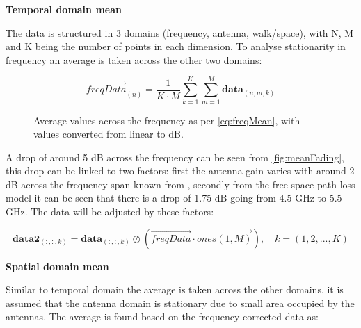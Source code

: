 \newpage
\textbf{Temporal domain mean}

The data is structured in 3 domains (frequency, antenna, walk/space), with N, M and K being the number of points in each dimension. To analyse stationarity in frequency an average is taken across the other two domains:

\begin{equation}\label{eq:freqMean}
\overrightarrow{freqData}_{(n)} = \frac{1}{K\cdot M}\sum_{k = 1}^{K}\sum_{m = 1}^{M} \textbf{data}_{(n,m,k)}
\end{equation}
\begin{where}
\end{where}


\begin{figure}[H]
\centering

\caption{Average values across the frequency as per \autoref{eq:freqMean}, with values converted from linear to dB.}
\label{fig:meanFading}
\end{figure}

A drop of around 5 dB across the frequency can be seen from \autoref{fig:meanFading}, this drop can be linked to two factors: first the antenna gain varies with around 2 dB across the frequency span known from , secondly from the free space path loss model it can be seen that there is a drop of 1.75 dB going from 4.5 GHz to 5.5 GHz. The data will be adjusted by these factors:

\begin{equation}
\textbf{data2}_{(:,:,k)} =  \textbf{data}_{(:,:,k)} \oslash \left(\overrightarrow{freqData}\cdot \overrightarrow{ones(1,M)}\right), \quad k = (1,2,...,K)
\end{equation}
\begin{where}
\end{where}

\textbf{Spatial domain mean}

Similar to temporal domain the average is taken across the other domains, it is assumed that the antenna domain is stationary due to small area occupied by the antennas. The average is found based on the frequency corrected data as:

